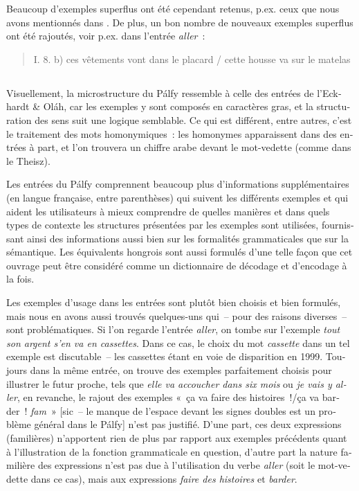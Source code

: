 \documentclass[output=paper,colorlinks,citecolor=brown,arabicfont,chinesefont,booklanguage=french]{langscibook}
\begin{document}
\begin{otherlanguage}{french}
Beaucoup d’exemples superflus ont été cependant retenus, p.ex. ceux que nous avons mentionnés dans . De plus, un bon nombre de nouveaux exemples superflus ont été rajoutés, voir p.ex. dans l’entrée \emph{aller}~:

\begin{quote}
    I. 8. b)	ces vêtements vont dans le placard / cette housse va sur le matelas
\end{quote}

\subsection{\citealt{Palfy1999} }\label{sec:tillinger:3.9}

Visuellement, la microstructure du Pálfy ressemble à celle des entrées de l’Eckhardt \& Oláh, car les exemples y sont composés en caractères gras, et la structuration des sens suit une logique semblable. Ce qui est différent, entre autres, c’est le traitement des mots homonymiques~: les homonymes apparaissent dans des entrées à part, et l’on trouvera un chiffre arabe devant le mot-vedette (comme dans le Theisz). 

Les entrées du Pálfy comprennent beaucoup plus d’informations supplémentaires (en langue française, entre parenthèses) qui suivent les différents exemples et qui aident les utilisateurs à mieux comprendre de quelles manières et dans quels types de contexte les structures présentées par les exemples sont utilisées, fournissant ainsi des informations aussi bien sur les formalités grammaticales que sur la sémantique. Les équivalents hongrois sont aussi formulés d’une telle façon que cet ouvrage peut être considéré comme un dictionnaire de décodage et d’encodage à la fois.

Les exemples d’usage dans les entrées sont plutôt bien choisis et bien formulés, mais nous en avons aussi trouvés quelques-uns qui~-- pour des raisons diverses~-- sont problématiques. Si l’on regarde l’entrée \emph{aller}, on tombe sur l’exemple \emph{tout son argent s’en va en cassettes}. Dans ce cas, le choix du mot \emph{cassette} dans un tel exemple est discutable~-- les cassettes étant en voie de disparition en 1999. Toujours dans la même entrée, on trouve des exemples parfaitement choisis pour illustrer le futur proche, tels que \emph{elle va accoucher dans six mois} ou \emph{je vais y aller}, en revanche, le rajout des exemples «~ça va faire des histoires~!/ça va barder~! \emph{fam}~» [sic~-- le manque de l’espace devant les signes doubles est un problème général dans le Pálfy] n’est pas justifié. D’une part, ces deux expressions (familières) n’apportent rien de plus par rapport aux exemples précédents quant à l’illustration de la fonction grammaticale en question, d’autre part la nature familière des expressions n’est pas due à l’utilisation du verbe \emph{aller} (soit le mot-vedette dans ce cas), mais aux expressions \emph{faire des histoires} et \emph{barder}. 


\end{otherlanguage}
\end{document}
